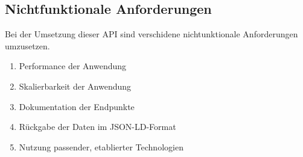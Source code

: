 \subsection{Nichtfunktionale Anforderungen} \label{sec:N_Anforderungen}
    Bei der Umsetzung dieser API sind verschidene nichtunktionale Anforderungen umzusetzen.
    \begin{enumerate}
        \item Performance der Anwendung \label{nf:one}
        \item Skalierbarkeit der Anwendung \label{nf:two}
        \item Dokumentation der Endpunkte \label{nf:three}
        \item Rückgabe der Daten im JSON-LD-Format \label{nf:four}
        \item Nutzung passender, etablierter Technologien \label{nf:five}
    \end{enumerate}